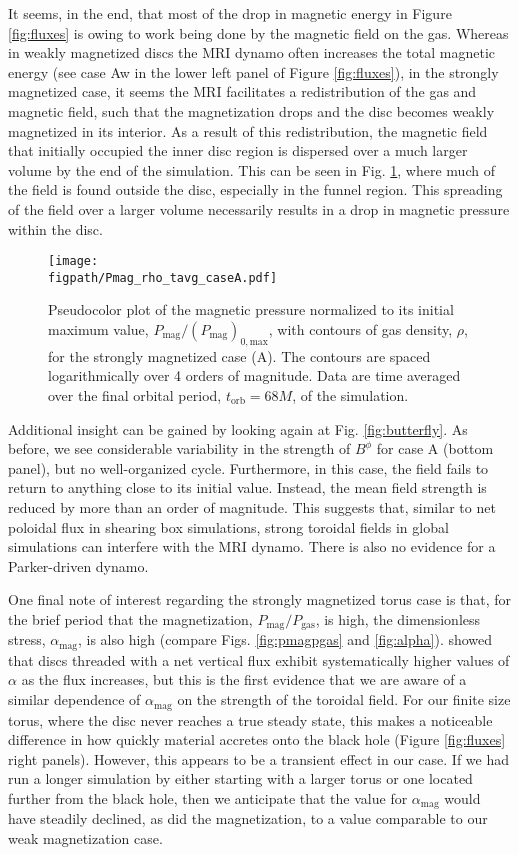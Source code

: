 \documentclass[useAMS,usenatbib]{mn2e}
\newcommand{\figpath}{.}
\def\pmpg{P_\mathrm{mag}/P_\mathrm{gas}}
\begin{document}
It seems, in the end, that most of the drop in magnetic energy in Figure \ref{fig:fluxes} is owing to work being done by the magnetic field on the gas.  Whereas in weakly magnetized discs the MRI dynamo often increases the total magnetic energy (see case Aw in the lower left panel of Figure \ref{fig:fluxes}), in the strongly magnetized case, it seems the MRI facilitates a redistribution of the gas and magnetic field, such that the magnetization drops and the disc becomes weakly magnetized in its interior. As a result of this redistribution, the magnetic field that initially occupied the inner disc region is dispersed over a much larger volume by the end of the simulation.  This can be seen in Fig. \ref{fig:pmag_rho}, where much of the field is found outside the disc, especially in the funnel region.  This spreading of the field over a larger volume necessarily results in a drop in magnetic pressure within the disc.

\begin{figure}
\centering
\texttt{[image: \\figpath/Pmag\_rho\_tavg\_caseA.pdf]}
\caption{Pseudocolor plot of the magnetic pressure normalized to its initial maximum value, $P_\mathrm{mag}/(P_\mathrm{mag})_{0,\mathrm{max}}$, with contours of gas density, $\rho$, for the strongly magnetized case (A).  The contours are spaced logarithmically over 4 orders of magnitude.  Data are time averaged over the final orbital period, $t_\mathrm{orb} = 68 M$, of the simulation.}
\label{fig:pmag_rho}
\end{figure}


Additional insight can be gained by looking again at Fig. \ref{fig:butterfly}.  As before, we see considerable variability in the strength of $B^\phi$ for case A (bottom panel), but no well-organized cycle.  Furthermore, in this case, the field fails to return to anything close to its initial value.  Instead, the mean field strength is reduced by more than an order of magnitude.  This suggests that, similar to net poloidal flux in shearing box simulations, strong toroidal fields in global simulations can interfere with the MRI dynamo.  There is also no evidence for a Parker-driven dynamo.

One final note of interest regarding the strongly magnetized torus case is that, for the brief period that the magnetization, $\pmpg$, is high, the dimensionless stress, $\alpha_\mathrm{mag}$, is also high (compare Figs. \ref{fig:pmagpgas} and \ref{fig:alpha}).  \citet{Bai13,Salvesen16a} showed that discs threaded with a net vertical flux exhibit systematically higher values of $\alpha$ as the flux increases, but this is the first evidence that we are aware of a similar dependence of $\alpha_\mathrm{mag}$ on the strength of the toroidal field.  For our finite size torus, where the disc never reaches a true steady state, this makes a noticeable difference in how quickly material accretes onto the black hole (Figure \ref{fig:fluxes} right panels).  However, this appears to be a transient effect in our case.  If we had run a longer simulation by either starting with a larger torus or one located further from the black hole, then we anticipate that the value for $\alpha_\mathrm{mag}$ would have steadily declined, as did the magnetization, to a value comparable to our weak magnetization case.
\end{document}
